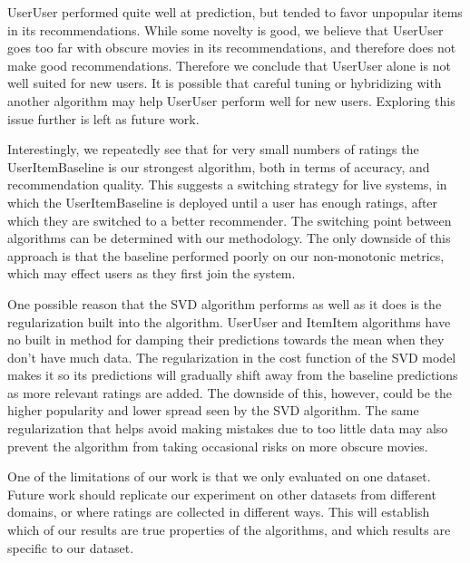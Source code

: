 \documentclass[letterpaper]{sig-alternate}
\begin{document}
  UserUser performed quite well at prediction, but tended to favor unpopular items in its recommendations.
  While some novelty is good, we believe that UserUser goes too far with obscure movies in its recommendations, and therefore does not make good recommendations.
  Therefore we conclude that UserUser alone is not well suited for new users.
  It is possible that careful tuning or hybridizing with another algorithm may help UserUser perform well for new users.
  Exploring this issue further is left as future work.

  Interestingly, we repeatedly see that for very small numbers of ratings the UserItemBaseline is our strongest algorithm, both in terms of accuracy, and recommendation quality.
  This suggests a switching strategy for live systems, in which the UserItemBaseline is deployed until a user has enough ratings, after which they are switched to a better recommender.
  The switching point between algorithms can be determined with our methodology.
  The only downside of this approach is that the baseline performed poorly on our non-monotonic metrics, which may effect users as they first join the system.
  

  One possible reason that the SVD algorithm performs as well as it does is the regularization built into the algorithm.
  UserUser and ItemItem algorithms have no built in method for damping their predictions towards the mean when they don't have much data.
  The regularization in the cost function of the SVD model makes it so its predictions will gradually shift away from the baseline predictions as more relevant ratings are added.
  The downside of this, however, could be the higher popularity and lower spread seen by the SVD algorithm.
  The same regularization that helps avoid making mistakes due to too little data may also prevent the algorithm from taking occasional risks on more obscure movies.
  


  One of the limitations of our work is that we only evaluated on one dataset.
  Future work should replicate our experiment on other datasets from different domains, or where ratings are collected in different ways.
  This will establish which of our results are true properties of the algorithms, and which results are specific to our dataset.
\end{document}
